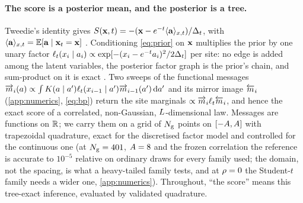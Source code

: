 \paragraph{The score is a posterior mean, and the posterior is a tree.}
Tweedie's identity gives $S(\mathbf{x},t)=-(\mathbf{x}-e^{-t}\langle \mathbf{a} \rangle_{x,t})/\Delta_t$, with
$\langle \mathbf{a} \rangle_{x,t}=\mathbb{E}[\mathbf{a}\mid\mathbf{x}_t=\mathbf{x}]$ \citep{robbins1956empirical,efron2011tweedie}. Conditioning
\cref{eq:prior} on $\mathbf{x}$ multiplies the prior by one unary factor
$\ell_t(x_i\mid a_i)\propto\exp[-(x_i-e^{-t}a_i)^2/2\Delta_t]$ per site: no edge is added among
the latent variables, the posterior factor graph is the prior's chain, and sum-product
on it is exact \citep{pearl1988probabilistic,kschischang2001factor}. Two sweeps of the
functional messages $\overrightarrow{m}_i(a)\propto\int K(a\mid a')\ell_t(x_{i-1}\mid
a')\overrightarrow{m}_{i-1}(a')\,\mathrm{d} a'$ and its mirror image $\overleftarrow{m}_i$ (\cref{app:numerics},
\cref{eq:bp}) return the site marginals $\propto\overrightarrow{m}_i\ell_t\overleftarrow{m}_i$, and hence the exact
score of a correlated, non-Gaussian, $L$-dimensional law. Messages are functions on
$\mathbb{R}$; we carry them on a grid of $N_{\mathrm{g}}$ points on $[-A,A]$ with
trapezoidal quadrature, exact for the discretised factor model and controlled for the
continuous one (at $N_{\mathrm{g}}=401$, $A=8$ and the frozen correlation the reference is accurate
to $10^{-5}$ relative on ordinary draws for every family used; the domain, not the spacing,
is what a heavy-tailed family tests, and at $\rho=0$ the Student-$t$ family needs a wider
one, \cref{app:numerics}). Throughout, ``the score'' means this
tree-exact inference, evaluated by validated quadrature.

